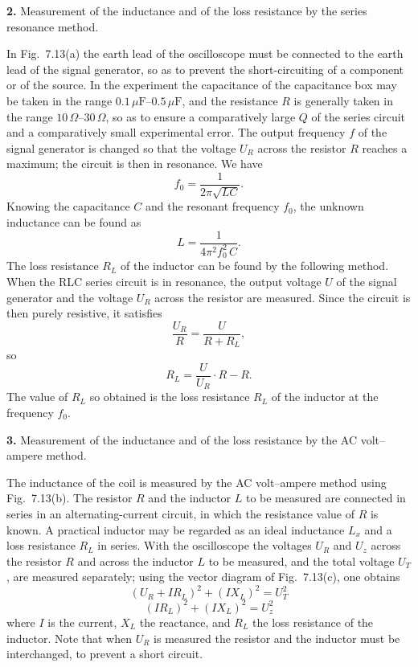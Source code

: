 \textbf{2.} Measurement of the inductance and of the loss resistance by the series resonance method.

In Fig.~7.13(a) the earth lead of the oscilloscope must be connected to the earth lead of the signal generator, so as to prevent the short-circuiting of a component or of the source. In the experiment the capacitance of the capacitance box may be taken in the range $0.1\,\mu\mathrm{F}$--$0.5\,\mu\mathrm{F}$, and the resistance $R$ is generally taken in the range $10\,\Omega$--$30\,\Omega$, so as to ensure a comparatively large $Q$ of the series circuit and a comparatively small experimental error. The output frequency $f$ of the signal generator is changed so that the voltage $U_R$ across the resistor $R$ reaches a maximum; the circuit is then in resonance. We have
\[
f_0=\frac{1}{2\pi\sqrt{LC}}.
\]
Knowing the capacitance $C$ and the resonant frequency $f_0$, the unknown inductance can be found as
\[
L=\frac{1}{4\pi^2 f_0^2\,C}.
\]
The loss resistance $R_L$ of the inductor can be found by the following method. When the RLC series circuit is in resonance, the output voltage $U$ of the signal generator and the voltage $U_R$ across the resistor are measured. Since the circuit is then purely resistive, it satisfies
\[
\frac{U_R}{R}=\frac{U}{R+R_L},
\]
so
\[
R_L=\frac{U}{U_R}\cdot R-R.
\]
The value of $R_L$ so obtained is the loss resistance $R_L$ of the inductor at the frequency $f_0$.

\textbf{3.} Measurement of the inductance and of the loss resistance by the AC volt--ampere method.

The inductance of the coil is measured by the AC volt--ampere method using Fig.~7.13(b). The resistor $R$ and the inductor $L$ to be measured are connected in series in an alternating-current circuit, in which the resistance value of $R$ is known. A practical inductor may be regarded as an ideal inductance $L_x$ and a loss resistance $R_L$ in series. With the oscilloscope the voltages $U_R$ and $U_z$ across the resistor $R$ and across the inductor $L$ to be measured, and the total voltage $U_T$, are measured separately; using the vector diagram of Fig.~7.13(c), one obtains
\begin{equation}
(U_R+IR_L)^2+(IX_L)^2=U_T^2 \tag{1}
\end{equation}
\begin{equation}
(IR_L)^2+(IX_L)^2=U_z^2 \tag{2}
\end{equation}
where $I$ is the current, $X_L$ the reactance, and $R_L$ the loss resistance of the inductor. Note that when $U_R$ is measured the resistor and the inductor must be interchanged, to prevent a short circuit.

